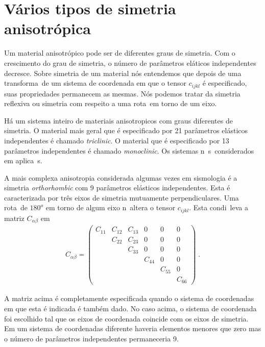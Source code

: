 \section{V\'arios tipos de simetria anisotr\'opica}

Um material anisotr\'opico pode ser de diferentes graus de
simetria. Com o crescimento do grau de simetria, o n\'umero
de par\^ametros el\'aticos independentes decresce. Sobre
simetria de um material n\'os entendemos que depois de uma
transforma\cao\ de um sistema de coordenada em que o tensor
$c_{ijkl}$ \'e especificado, suas propriedades permanecem
as mesmas. N\'os podemos tratar da simetria reflexiva ou
simetria com respeito a uma rota\cao\ em torno de um eixo.

H\'a um sistema inteiro de materiais anisotropicos com
graus diferentes de simetria. O material mais geral que
\'e especificado por 21 par\^ametros el\'asticos
independentes \'e chamado {\it triclinic}. O material que
\'e especificado por 13 par\^ametros independentes \'e
chamado {\it monoclinic}. Os sistemas n\ao\ s\ao\
considerados em aplica\coes\ s\ismicas.

A mais complexa anisotropia considerada algumas vezes em 
sismologia \'e a simetria {\it orthorhombic} com 9
par\^ametros el\'asticos independentes. Esta \'e
caracterizada por tr\^es eixos de simetria mutuamente
perpendiculares. Uma rota\cao\ de $180^{o}$ em
torno de algum eixo n\ao\ altera o tensor $c_{ijkl}$.
Esta condi\cao\ leva a matriz $C_{\alpha \beta}$ em
\begin{eqnarray}
C_{\alpha \beta} = \left(
\begin{array}{cccccc}
C_{11} & C_{12} & C_{13} & 0      & 0      & 0 \\
       & C_{22} & C_{23} & 0      & 0      & 0 \\
       &        & C_{33} & 0      & 0      & 0 \\
       &        &        & C_{44} & 0      & 0 \\
       &        &        &        & C_{55} & 0 \\
       &        &        &        &        & C_{66}
\end{array} \right) \; .
\end{eqnarray}

A matriz acima \'e completamente especificada quando o
sistema de coordenadas em que esta \'e indicada \'e
tamb\'em dado. No caso acima, o sistema de coordenada foi
escolhido tal que os eixos de coordenada coincide com os
eixos de simetria. Em um sistema de coordenadas diferente
haveria elementos menores que zero mas o n\'umero de
par\^ametros independentes permaneceria 9.

